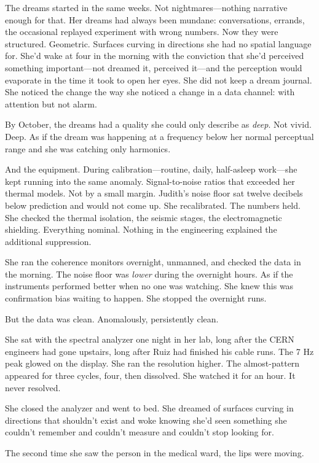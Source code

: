 The dreams started in the same weeks. Not nightmares---nothing narrative enough for that. Her dreams had always been mundane: conversations, errands, the occasional replayed experiment with wrong numbers. Now they were structured. Geometric. Surfaces curving in directions she had no spatial language for. She'd wake at four in the morning with the conviction that she'd perceived something important---not dreamed it, perceived it---and the perception would evaporate in the time it took to open her eyes. She did not keep a dream journal. She noticed the change the way she noticed a change in a data channel: with attention but not alarm.

By October, the dreams had a quality she could only describe as \textit{deep}. Not vivid. Deep. As if the dream was happening at a frequency below her normal perceptual range and she was catching only harmonics.

And the equipment. During calibration---routine, daily, half-asleep work---she kept running into the same anomaly. Signal-to-noise ratios that exceeded her thermal models. Not by a small margin. Judith's noise floor sat twelve decibels below prediction and would not come up. She recalibrated. The numbers held. She checked the thermal isolation, the seismic stages, the electromagnetic shielding. Everything nominal. Nothing in the engineering explained the additional suppression.

She ran the coherence monitors overnight, unmanned, and checked the data in the morning. The noise floor was \textit{lower} during the overnight hours. As if the instruments performed better when no one was watching. She knew this was confirmation bias waiting to happen. She stopped the overnight runs.

But the data was clean. Anomalously, persistently clean.

She sat with the spectral analyzer one night in her lab, long after the CERN engineers had gone upstairs, long after Ruiz had finished his cable runs. The 7 Hz peak glowed on the display. She ran the resolution higher. The almost-pattern appeared for three cycles, four, then dissolved. She watched it for an hour. It never resolved.

She closed the analyzer and went to bed. She dreamed of surfaces curving in directions that shouldn't exist and woke knowing she'd seen something she couldn't remember and couldn't measure and couldn't stop looking for.

\scenebreak

The second time she saw the person in the medical ward, the lips were moving.

